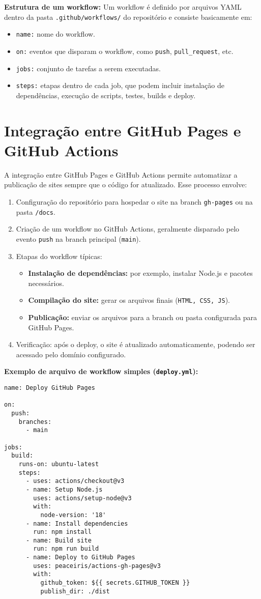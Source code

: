 \textbf{Estrutura de um workflow:}  
Um workflow é definido por arquivos YAML dentro da pasta \texttt{.github/workflows/} do repositório e consiste basicamente em:
\begin{itemize}
    \item \texttt{name:} nome do workflow.
    \item \texttt{on:} eventos que disparam o workflow, como \texttt{push}, \texttt{pull\_request}, etc.
    \item \texttt{jobs:} conjunto de tarefas a serem executadas.
    \item \texttt{steps:} etapas dentro de cada job, que podem incluir instalação de dependências, execução de scripts, testes, builds e deploy.
\end{itemize}

\section{Integração entre GitHub Pages e GitHub Actions}
A integração entre GitHub Pages e GitHub Actions permite automatizar a publicação de sites sempre que o código for atualizado. Esse processo envolve:
\begin{enumerate}
    \item Configuração do repositório para hospedar o site na branch \texttt{gh-pages} ou na pasta \texttt{/docs}.
    \item Criação de um workflow no GitHub Actions, geralmente disparado pelo evento \texttt{push} na branch principal (\texttt{main}).
    \item Etapas do workflow típicas:
    \begin{itemize}
        \item \textbf{Instalação de dependências:} por exemplo, instalar Node.js e pacotes necessários.
        \item \textbf{Compilação do site:} gerar os arquivos finais (\texttt{HTML, CSS, JS}).
        \item \textbf{Publicação:} enviar os arquivos para a branch ou pasta configurada para GitHub Pages.
    \end{itemize}
    \item Verificação: após o deploy, o site é atualizado automaticamente, podendo ser acessado pelo domínio configurado.
\end{enumerate}

\textbf{Exemplo de arquivo de workflow simples (\texttt{deploy.yml}):}
\begin{verbatim}
name: Deploy GitHub Pages

on:
  push:
    branches:
      - main

jobs:
  build:
    runs-on: ubuntu-latest
    steps:
      - uses: actions/checkout@v3
      - name: Setup Node.js
        uses: actions/setup-node@v3
        with:
          node-version: '18'
      - name: Install dependencies
        run: npm install
      - name: Build site
        run: npm run build
      - name: Deploy to GitHub Pages
        uses: peaceiris/actions-gh-pages@v3
        with:
          github_token: ${{ secrets.GITHUB_TOKEN }}
          publish_dir: ./dist
\end{verbatim}

